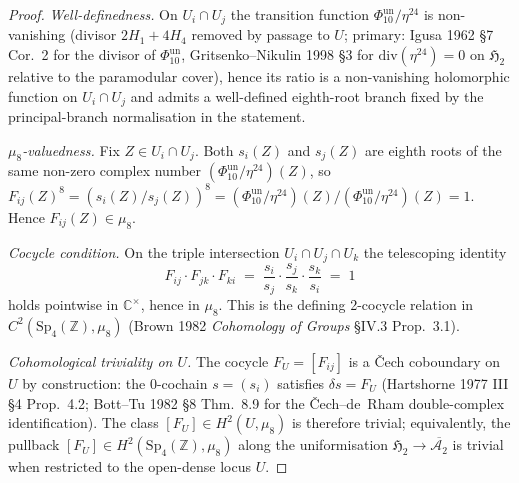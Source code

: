 \begin{proof}
\emph{Well-definedness.} On $U_i\cap U_j$ the transition function
$\Phi_{10}^{\mathrm{un}}/\eta^{24}$ is non-vanishing (divisor $2H_1 + 4H_4$ removed by
passage to $U$; primary: Igusa 1962 \S7 Cor.~2 for the divisor of
$\Phi_{10}^{\mathrm{un}}$, Gritsenko--Nikulin 1998 \S3 for
$\mathrm{div}(\eta^{24}) = 0$ on $\mathfrak H_2$ relative to the
paramodular cover), hence its ratio is a non-vanishing holomorphic
function on $U_i\cap U_j$ and admits a well-defined eighth-root branch
fixed by the principal-branch normalisation in the statement.

\emph{$\mu_8$-valuedness.} Fix $Z\in U_i\cap U_j$. Both
$s_i(Z)$ and $s_j(Z)$ are eighth roots of the same non-zero complex
number $(\Phi_{10}^{\mathrm{un}}/\eta^{24})(Z)$, so
$F_{ij}(Z)^8 = (s_i(Z)/s_j(Z))^8 =
(\Phi_{10}^{\mathrm{un}}/\eta^{24})(Z)/
(\Phi_{10}^{\mathrm{un}}/\eta^{24})(Z) = 1$. Hence $F_{ij}(Z)\in\mu_8$.

\emph{Cocycle condition.} On the triple intersection
$U_i\cap U_j\cap U_k$ the telescoping identity
\[
 F_{ij}\cdot F_{jk}\cdot F_{ki}
 \;=\;
 \frac{s_i}{s_j}\cdot\frac{s_j}{s_k}\cdot\frac{s_k}{s_i}
 \;=\; 1
\]
holds pointwise in $\mathbb C^\times$, hence in $\mu_8$. This is the
defining 2-cocycle relation in $C^2(\mathrm{Sp}_4(\mathbb Z), \mu_8)$
(Brown 1982 \emph{Cohomology of Groups} \S IV.3 Prop.~3.1).

\emph{Cohomological triviality on $U$.} The cocycle
$F_U = [F_{ij}]$ is a \v{C}ech coboundary on $U$ by construction: the
$0$-cochain $s = (s_i)$ satisfies $\delta s = F_U$
(Hartshorne 1977 III \S4 Prop.~4.2; Bott--Tu 1982 \S8 Thm.~8.9 for the
\v{C}ech--de~Rham double-complex identification). The class
$[F_U]\in H^2(U, \mu_8)$ is therefore trivial; equivalently, the pullback
$[F_U]\in H^2(\mathrm{Sp}_4(\mathbb Z), \mu_8)$ along the uniformisation
$\mathfrak H_2\to\overline{\mathcal A_2}$ is trivial when restricted
to the open-dense locus $U$.


\end{proof}
